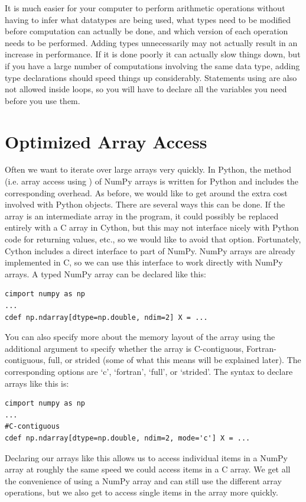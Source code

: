 It is much easier for your computer to perform arithmetic operations without having to infer what datatypes are being used, what types need to be modified before computation can actually be done, and which version of each operation needs to be performed.
Adding types unnecessarily may not actually result in an increase in performance. If it is done poorly it can actually slow things down, but if you have a large number of computations involving the same data type, adding type declarations should speed things up considerably.
Statements using  are also not allowed inside loops, so you will have to declare all the variables you need before you use them.

\section*{Optimized Array Access}
Often we want to iterate over large arrays very quickly.
In Python, the  method (i.e. array access using \li{[ ]}) of NumPy arrays is written for Python and includes the corresponding overhead.
As before, we would like to get around the extra cost involved with Python objects.
There are several ways this can be done.
If the array is an intermediate array in the program, it could possibly be replaced entirely with a C array in Cython, but this may not interface nicely with Python code for returning values, etc., so we would like to avoid that option.
Fortunately, Cython includes a direct interface to part of NumPy.
NumPy arrays are already implemented in C, so we can use this interface to work directly with NumPy arrays.
A typed NumPy array can be declared like this:
\begin{lstlisting}
cimport numpy as np
...
cdef np.ndarray[dtype=np.double, ndim=2] X = ...
\end{lstlisting}
You can also specify more about the memory layout of the array using the additional argument  to specify whether the array is C-contiguous, Fortran-contiguous, full, or strided (some of what this means will be explained later).
The corresponding options are `c', `fortran', `full', or `strided'.
The syntax to declare arrays like this is:
\begin{lstlisting}
cimport numpy as np
...
#C-contiguous
cdef np.ndarray[dtype=np.double, ndim=2, mode='c'] X = ...
\end{lstlisting}
Declaring our arrays like this allows us to access individual items in a NumPy array at roughly the same speed we could access items in a C array.
We get all the convenience of using a NumPy array and can still use the different array operations, but we also get to access single items in the array more quickly.
